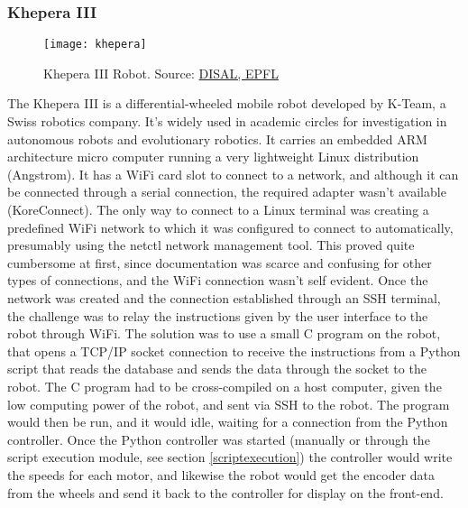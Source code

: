 \subsubsection{Khepera III} \label{kheperaIII}
\begin{figure}[H]
\centering
\texttt{[image: khepera]}
\caption{Khepera III Robot. Source: \href{http://disal.epfl.ch/page-32508-en.html}{DISAL, EPFL}}
\end{figure}
The Khepera III is a differential-wheeled mobile robot developed by K-Team, a Swiss robotics company. It's widely used in academic
circles for investigation in autonomous robots and evolutionary robotics. It carries an embedded ARM architecture micro computer running
a very lightweight Linux distribution (Angstrom). It has a WiFi card slot to connect to a network, and although it can be connected
through a serial connection, the required adapter wasn't available (KoreConnect). The only way to connect to a Linux terminal was
creating a predefined WiFi network to which it was configured to connect to automatically, presumably using the netctl network
management tool. This proved quite cumbersome at first, since documentation was scarce and confusing for other types of connections, and
the WiFi connection wasn't self evident. Once the network was created and the connection established through an SSH terminal, the
challenge was to relay the instructions given by the user interface to the robot through WiFi. The solution was to use a small C program
on the robot, that opens a TCP/IP socket connection to receive the instructions from a Python script that reads the database and sends
the data through the socket to the robot. The C program had to be cross-compiled on a host computer, given the low computing power of
the robot, and sent via SSH to the robot. The program would then be run, and it would idle, waiting for a connection from the Python
controller. Once the Python controller was started (manually or through the script execution module, see section \ref{scriptexecution})
the controller would write the speeds for each motor, and likewise the robot would get the encoder data from the wheels and send it back
to the controller for display on the front-end.\\

